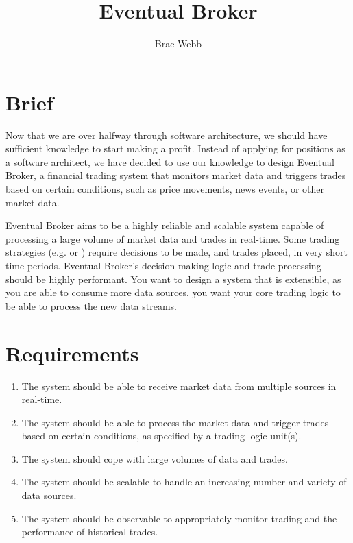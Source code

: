 \documentclass{csse4400}
\title{Eventual Broker}
\author{Brae Webb}
\date{\week[tutorial]{7}}
\begin{document}
\maketitle

\section{Brief}

Now that we are over halfway through software architecture,
we should have sufficient knowledge to start making a profit.
Instead of applying for positions as a software architect,
we have decided to use our knowledge to design 
Eventual Broker,
a financial trading system that monitors market data and triggers trades based on certain conditions,
such as price movements, news events, or other market data.

Eventual Broker aims to be a highly reliable and scalable system capable of processing a large volume of market data and trades in real-time.
Some trading strategies (e.g. 
or )
require decisions to be made, and trades placed, in very short time periods.
Eventual Broker's decision making logic and trade processing should be highly performant.
You want to design a system that is extensible,
as you are able to consume more data sources,
you want your core trading logic to be able to process the new data streams.

\section{Requirements}

\begin{enumerate}
\item The system should be able to receive market data from multiple sources in real-time.
\item The system should be able to process the market data and trigger trades based on certain conditions, as specified by a trading logic unit(s).
\item The system should cope with large volumes of data and trades.
\item The system should be scalable to handle an increasing number and variety of data sources.
\item The system should be observable to appropriately monitor trading and the performance of historical trades.
\end{enumerate}
\end{document}
